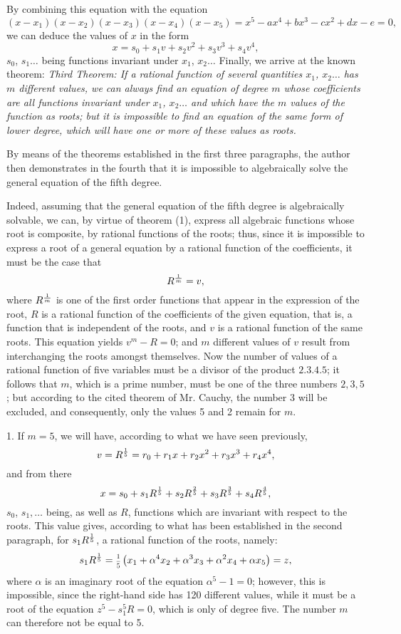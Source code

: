 \documentclass[oneside, 12 pt, leqno]{memoir}
\let\oldfrac\frac
\def\frac#1#2{\mathchoice{\text{\scalebox{.83}{${\oldfrac{#1}{#2}}$}}}{\text{\scalebox{.83}{${\displaystyle\oldfrac{#1}{#2}}$}}}{\genfrac{}{}{}{2}{#1}{#2}}{\genfrac{}{}{}{3}{#1}{#2}}}
\begin{document}
By combining this equation with the equation
\[\left(x-x_1\right)\left(x-x_2\right)\left(x-x_3\right)\left(x-x_4\right)\left(x-x_5\right) = x^5-a x^4+b x^3-c x^2+d x-e=0,\]
we can deduce the values of \(x\) in the form
\[x=s_0+s_1 v+s_2 v^2+s_3 v^3+s_4 v^4,\]
\(s_0\), \(s_1 \dots\) being functions invariant under \(x_1\), \(x_2 \dots\) Finally, we arrive at the known theorem: \textit{Third Theorem: If a rational function of several quantities \(x_1\), \(x_2 \dots\) has \(m\) different values, we can always find an equation of degree \(m\) whose coefficients are all functions invariant under \(x_1\), \(x_2 \dots\) and which have the \(m\) values of the function as roots; but it is impossible to find an equation of the same form of lower degree, which will have one or more of these values as roots.}

By means of the theorems established in the first three paragraphs, the author then demonstrates in the fourth that it is impossible to algebraically solve the general equation of the fifth degree.

Indeed, assuming that the general equation of the fifth degree is algebraically solvable, we can, by virtue of theorem (1), express all algebraic functions whose root is composite, by rational functions of the roots; thus, since it is impossible to express a root of a general equation by a rational function of the coefficients, it must be the case that
\[R^{\frac{1}{m}}=v,\]
where \(R^{\frac{1}{m}}\) is one of the first order functions that appear in the expression of the root, \(R\) is a rational function of the coefficients of the given equation, that is, a function that is independent of the roots, and \(v\) is a rational function of the same roots. This equation yields \(v^m-{R}=0\); and \(m\) different values of \(v\) result from interchanging the roots amongst themselves. Now the number of values of a rational function of five variables must be a divisor of the product \(2.3.4.5\); it follows that \(m\), which is a prime number, must be one of the three numbers \(2,3,5\); but according to the cited theorem of Mr. Cauchy, the number 3 will be excluded, and consequently, only the values 5 and 2 remain for \(m\).

1. If \(m=5\), we will have, according to what we have seen previously,
\[v={R}^{\frac{1}{5}}=r_0+r_1 x+r_2 x^2+r_3 x^3+r_4 x^4,\]
and from there
\[x=s_0+s_1 R^{\frac{1}{5}}+s_2 R^{\frac{2}{5}}+s_3 R^{\frac{3}{5}}+s_4 R^{\frac{4}{5}},\]
\(s_0\), \(s_1, \dots\) being, as well as \(R\), functions which are invariant with respect to the roots. This value gives, according to what has been established in the second paragraph, for \(s_1 R^{\frac{1}{5}}\), a rational function of the roots, namely:
\[s_1 R^{\frac{1}{5}}=\frac{1}{5}\left(x_1+\alpha^4 x_2+\alpha^3 x_3+\alpha^2 x_4+\alpha x_5\right)=z,\]
where \(\alpha\) is an imaginary root of the equation \(\alpha^5-1=0\); however, this is impossible, since the right-hand side has 120 different values, while it must be a root of the equation \(z^5-s_1^5 R=0\), which is only of degree five. The number \(m\) can therefore not be equal to 5.
\end{document}
